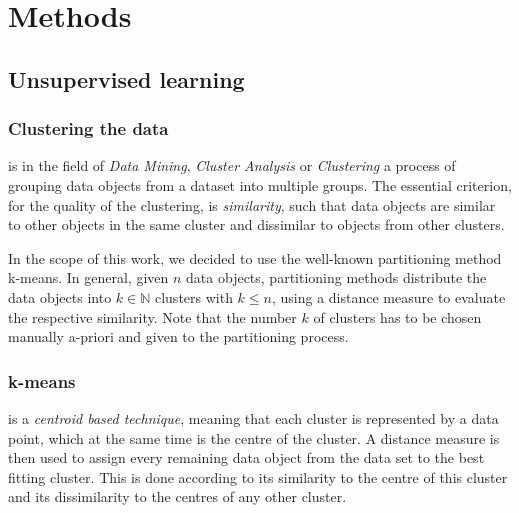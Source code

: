 \section{Methods}
	
	
	
	\subsection{Unsupervised learning}
	\subsubsection{Clustering the data}
	
	is in the field of \textit{Data Mining}, \textit{Cluster Analysis} or \textit{Clustering} a process of grouping data objects from a dataset into multiple groups. The essential criterion, for the quality of the clustering, is \textit{similarity}, such that data objects are similar to other objects in the same cluster and dissimilar to objects from other clusters. 
	
	In the scope of this work, we decided to use the well-known partitioning method k-means. In general, given $n$ data objects, partitioning methods distribute the data objects into $k\in\mathbb{N}$ clusters with $k\le n$, using a distance measure to evaluate the respective similarity. 
	Note that the number $k$ of clusters has to be chosen manually a-priori and given to the partitioning process.
	
	\subsubsection{k-means}
	
	is a \textit{centroid based technique}, meaning that each cluster is represented by a data point, which at the same time is the centre of the cluster. A distance measure is then used to assign every remaining data object from the data set to the best fitting cluster. This is done according to its similarity to the centre of this cluster and its dissimilarity to the centres of any other cluster.
	
